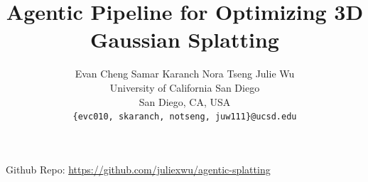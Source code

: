 \documentclass[10pt,twocolumn,letterpaper]{article}
\title{Agentic Pipeline for Optimizing 3D Gaussian Splatting}
\author{
Evan Cheng \quad Samar Karanch \quad Nora Tseng \quad Julie Wu\\
University of California San Diego\\
San Diego, CA, USA\\
{\tt\small \{evc010, skaranch, notseng, juw111\}@ucsd.edu}
}
\begin{document}
\maketitle





Github Repo: \url{https://github.com/juliexwu/agentic-splatting}

{
    \small
    
    
    \nocite{*}
}

% 
\end{document}
